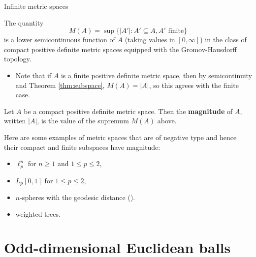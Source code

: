 \documentclass[12pt,mathserif]{beamer}
\begin{document}
\begin{frame}[allowframebreaks]{Infinite metric spaces}
\framebreak

\begin{theorem}
The quantity
\begin{equation*}
M(A) = \sup\{\vert A'\vert : A' \subseteq A, \text{$A'$ finite}\}
\end{equation*}
is a lower semicontinuous function of $A$ (taking values in $[0,\infty]$) in the class of compact positive definite metric spaces equipped with the Gromov-Hausdorff topology.
\end{theorem}

\begin{itemize}
\item Note that if $A$ is a finite positive definite metric space, then by semicontinuity and Theorem \ref{thm:subspace}, $M(A) = \vert A \vert$, so this agrees with the finite case.
\end{itemize}

\framebreak

\begin{definition}
Let $A$ be a compact positive definite metric space. Then the \textbf{magnitude} of $A$, written $\vert A \vert$, is the value of the supremum $M(A)$ above.
\end{definition}

\framebreak

Here are some examples of metric spaces that are of negative type and hence their compact and finite subspaces have magnitude:

\begin{example}
\begin{itemize}
\item $\ell_p^n$ for $n \geq 1$ and $1\leq p \leq 2$,
\item $L_p[0,1]$ for $1 \leq p \leq 2$,
\item $n$-spheres with the geodesic distance (\cite{willerton_magnitude_2014}).
\item weighted trees.
\end{itemize}
\end{example}

\end{frame}

\section{Odd-dimensional Euclidean balls}
\end{document}
